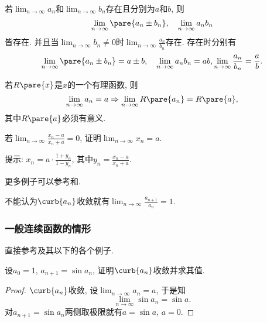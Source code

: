 \documentclass{ctexart}
\begin{document}
\begin{theorem}[极限的四则运算]
    \label{thm:极限的四则运算}
    若$\displaystyle \lim_{n\rightarrow\infty}a_n$和$\displaystyle \lim_{n\rightarrow\infty}b_n$存在且分别为$a$和$b$, 则
    \[ \lim_{n\rightarrow\infty} \pare{a_n\pm b_n},\quad \lim_{n\rightarrow\infty} a_n b_n \]
    皆存在. 并且当$\displaystyle \lim_{n\rightarrow\infty} b_n \neq 0$时$\displaystyle\lim_{n\rightarrow\infty}\frac{a_n}{b_n}$存在. 存在时分别有
    \[ \lim_{n\rightarrow\infty} \pare{a_n\pm b_n} = a\pm b,\quad \lim_{n\rightarrow\infty} a_n b_n = ab, \lim_{n\rightarrow\infty} \frac{a_n}{b_n} = \frac{a}{b}. \]
\end{theorem}
\begin{corollary}[多项式和极限可交换]
    若$R\pare{x}$是$x$的一个有理函数, 则
    \[ \lim_{n\rightarrow \infty} a_n = a \Rightarrow \lim_{n\rightarrow \infty} R\pare{a_n} = R\pare{a}, \]
    其中$R\pare{a}$必须有意义.
\end{corollary}
\begin{sample}
    \begin{ex}
        若$\displaystyle \lim_{n\rightarrow\infty} \frac{x_n-a}{x_n+a} = 0$, 证明$\displaystyle \lim_{n\rightarrow\infty} x_n = a$.
    \end{ex}
    提示: $\displaystyle x_n = a\cdot \frac{1+y_n}{1-y_n}$, 其中$\displaystyle y_n = \frac{x_n-a}{x_n+a}$.
\end{sample}
更多例子可以参考和.
\begin{pitfall}
    不能认为$\curb{a_n}$收敛就有$\displaystyle \lim_{n\rightarrow\infty}\frac{a_{n+1}}{a_n} = 1$.
\end{pitfall}


\subsubsection{一般连续函数的情形} %
\label{ssub:一般连续函数的情形}

直接参考及其以下的各个例子.
\begin{sample}
    \begin{ex}
        设$a_0 = 1$, $a_{n+1} = \sin a_n$, 证明$\curb{a_n}$收敛并求其值.
    \end{ex}
    \begin{proof}
        $\curb{a_n}$收敛, 设$\displaystyle \lim_{n\rightarrow\infty} a_n = a$, 于是知
        \[ \lim_{n\rightarrow\infty} \sin a_n = \sin a. \]
        对$a_{n+1} = \sin a_n$两侧取极限就有$a = \sin a$, $a=0$.
    \end{proof}
\end{sample}
\end{document}
